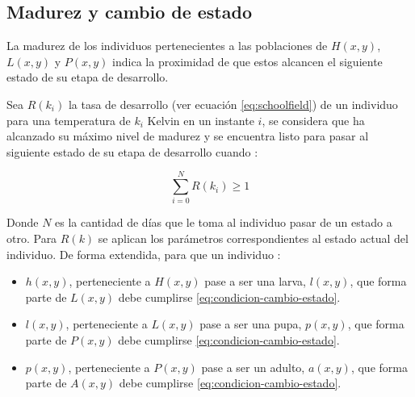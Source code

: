 \subsection{Madurez y cambio de estado}
\label{subsec:cap4-madurez-cambio-estado}
La madurez de los individuos pertenecientes a las poblaciones de $H(x,y)$, $L(x,y)$ y $P(x,y)$
indica la proximidad de que estos alcancen el siguiente estado de su etapa de desarrollo.

Sea $R(k_{i})$ la tasa de desarrollo (ver ecuación \eqref{eq:schoolfield}) de un individuo para
una temperatura de $k_{i}$ Kelvin en un instante $i$, se considera que ha alcanzado su máximo nivel
de madurez y se encuentra listo para pasar al siguiente estado de su etapa de desarrollo cuando :

\begin{equation}
\label{eq:condicion-cambio-estado}
    \sum_{i=0}^{N} R(k_{i}) \geq 1
\end{equation}

Donde $N$ es la cantidad de días que le toma al individuo pasar de un estado a otro. Para $R(k)$ se
aplican los parámetros correspondientes al estado actual del individuo. De forma extendida,
para que un individuo :

\begin{itemize}
\item $h(x,y)$, perteneciente a $H(x,y)$ pase a ser una larva, $l(x,y)$, que forma parte de $L(x,y)$ debe cumplirse \eqref{eq:condicion-cambio-estado}.

\item $l(x,y)$, perteneciente a $L(x,y)$ pase a ser una pupa, $p(x,y)$, que forma parte de $P(x,y)$ debe cumplirse \eqref{eq:condicion-cambio-estado}.

\item $p(x,y)$, perteneciente a $P(x,y)$ pase a ser un adulto, $a(x,y)$, que forma parte de $A(x,y)$ debe cumplirse \eqref{eq:condicion-cambio-estado}.
\end{itemize}




